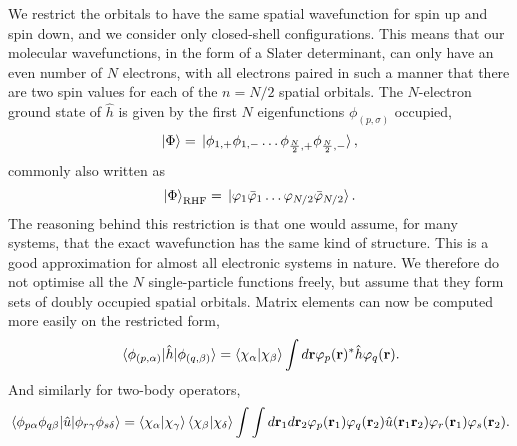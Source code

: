 We restrict the orbitals to have the same spatial wavefunction for spin up and spin
down, and we consider only closed-shell configurations. This means that our 
molecular wavefunctions, in the form of a Slater determinant, can only have an 
even number of $N$ electrons, with all electrons paired in such a manner that there 
are two spin values for each of the $n=N/2$ spatial orbitals. The $N$-electron 
ground state of $\hat{h}$ is given by the first $N$ eigenfunctions $\phi_{(p,\sigma)}$
occupied,
\begin{equation}
    \ket{\Phi} = \ket*{\phi_{1,+}\phi_{1,-}\dots \phi_{\frac{N}{2},+}\phi_{\frac{N}{2},-}},
\end{equation}
commonly also written as 
\begin{equation}
    \ket{\Phi}_{\text{RHF}} = 
    \ket*{\varphi_1 \bar{\varphi}_1 \dots \varphi_{N/2} \bar{\varphi}_{N/2}}.
\end{equation}
The reasoning behind this restriction is that one would assume, for many systems, that 
the exact wavefunction has the same kind of structure. This is a good approximation
for almost all 
electronic systems in nature. We therefore do not optimise all the $N$ single-particle 
functions freely, but assume that they form sets of doubly occupied spatial orbitals. 
Matrix elements can now be computed more easily on the restricted form,
\begin{equation}
    \mel*{\phi_{(p,\alpha)}}{\hat{h}}{\phi_{(q,\beta)}} 
    = \braket{\chi_\alpha}{\chi_\beta}
        \int d\vb{r} \varphi_p(\vb{r})^*\hat{h}\varphi_q(\vb{r}).
\end{equation}
And similarly for two-body operators,
\begin{equation}
    \mel{\phi_{p\alpha}\phi_{q\beta}}{\hat{u}}{\phi_{r\gamma}\phi_{s\delta}}
    = \braket{\chi_\alpha}{\chi_\gamma}\braket{\chi_\beta}{\chi_\delta}
        \int \int d \vb{r}_1 d \vb{r}_2 \varphi_p(\vb{r}_1)\varphi_q(\vb{r}_2)
            \hat{u}(\vb{r}_1 \vb{r}_2) \varphi_r(\vb{r}_1)\varphi_s(\vb{r}_2).
\end{equation}

